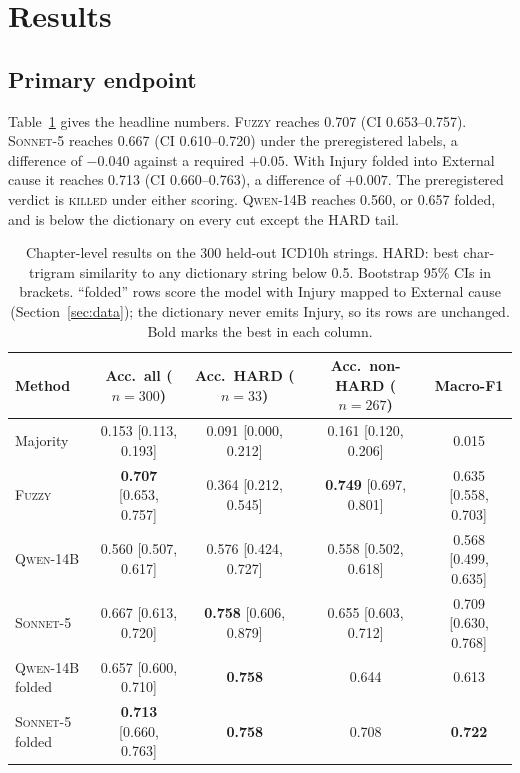 \documentclass[11pt]{article}
\newcommand{\Bfuzzy}{\textsc{Fuzzy}}
\newcommand{\Mcomm}{\textsc{Sonnet-5}}
\newcommand{\Mlocal}{\textsc{Qwen-14B}}
\begin{document}
\section{Results}
\label{sec:results}

\subsection{Primary endpoint}

Table~\ref{tab:main} gives the headline numbers. \Bfuzzy{} reaches 0.707 (CI 0.653--0.757). \Mcomm{} reaches 0.667 (CI 0.610--0.720) under the preregistered labels, a difference of $-0.040$ against a required $+0.05$. With Injury folded into External cause it reaches 0.713 (CI 0.660--0.763), a difference of $+0.007$. The preregistered verdict is \textsc{killed} under either scoring. \Mlocal{} reaches 0.560, or 0.657 folded, and is below the dictionary on every cut except the HARD tail.

\begin{table}[t]
\centering
\caption{Chapter-level results on the 300 held-out ICD10h strings. HARD: best char-trigram similarity to any dictionary string below 0.5. Bootstrap 95\% CIs in brackets. ``folded'' rows score the model with Injury mapped to External cause (Section~\ref{sec:data}); the dictionary never emits Injury, so its rows are unchanged. Bold marks the best in each column.}
\label{tab:main}
\footnotesize
\setlength{\tabcolsep}{4pt}
\begin{tabular}{lcccc}
\toprule
Method & Acc.\ all ($n{=}300$) & Acc.\ HARD ($n{=}33$) & Acc.\ non-HARD ($n{=}267$) & Macro-F1 \\
\midrule
Majority & 0.153 [0.113, 0.193] & 0.091 [0.000, 0.212] & 0.161 [0.120, 0.206] & 0.015 \\
\Bfuzzy{} & \textbf{0.707} [0.653, 0.757] & 0.364 [0.212, 0.545] & \textbf{0.749} [0.697, 0.801] & 0.635 [0.558, 0.703] \\
\Mlocal{} & 0.560 [0.507, 0.617] & 0.576 [0.424, 0.727] & 0.558 [0.502, 0.618] & 0.568 [0.499, 0.635] \\
\Mcomm{} & 0.667 [0.613, 0.720] & \textbf{0.758} [0.606, 0.879] & 0.655 [0.603, 0.712] & 0.709 [0.630, 0.768] \\
\midrule
\Mlocal{} folded & 0.657 [0.600, 0.710] & \textbf{0.758} & 0.644 & 0.613 \\
\Mcomm{} folded & \textbf{0.713} [0.660, 0.763] & \textbf{0.758} & 0.708 & \textbf{0.722} \\
\bottomrule
\end{tabular}
\end{table}
\end{document}
